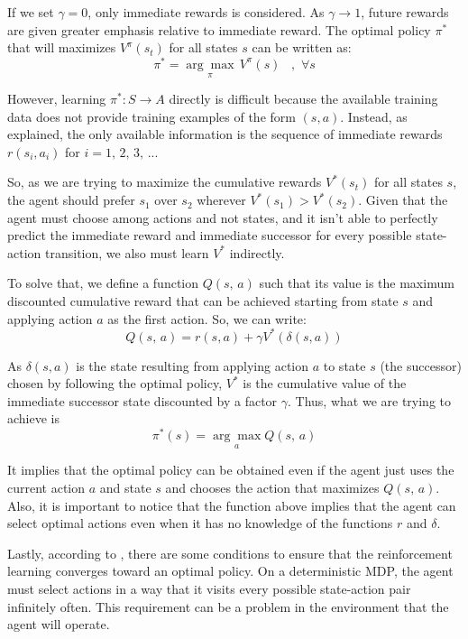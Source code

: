 \documentclass[a4paper]{article}
\begin{document}
If we set $\gamma=0$, only immediate rewards is considered. As $\gamma \rightarrow 1$, future rewards are given greater emphasis relative to immediate reward. The optimal policy $\pi^{*}$ that will maximizes $V^{\pi}(s_t)$ for all states $s$ can be written as:
$$\pi^{*} = \underset{\pi}{\arg \max} \, V^{\pi} (s)\,\,\,\,\,, \,\, \forall s$$

However, learning $\pi^{*}: S \rightarrow A$ directly is difficult because the available training data does not provide training examples of the form $(s, a)$. Instead, as \cite{Mitchell} explained, the only available information is the sequence of immediate rewards $r(s_i, a_i)$ for $i=1,\, 2,\, 3,\,...$

So, as we are trying to maximize the cumulative rewards $V^{*}(s_t)$ for all states $s$, the agent should prefer $s_1$ over $s_2$ wherever $V^{*}(s_1) > V^{*}(s_2)$. Given that the agent must choose among actions and not states, and it isn't able to perfectly predict the immediate reward and immediate successor for every possible state-action transition, we also must learn $V^{*}$ indirectly.

To solve that, we define a function $Q(s, \, a)$ such that its value is the maximum discounted cumulative reward that can be achieved starting from state $s$ and applying action $a$ as the first action. So, we can write:
$$Q(s, \, a) = r(s, a) + \gamma V^{*}(\delta(s, a))$$

As $\delta(s, a)$ is the state resulting from applying action $a$ to state $s$ (the successor) chosen by following the optimal policy, $V^{*}$ is the cumulative value of the immediate successor state discounted by a factor $\gamma$. Thus,  what we are trying to achieve is
$$\pi^{*}(s) = \underset{a}{\arg \max} Q(s, \, a)$$

It implies that the optimal policy can be obtained even if the agent just uses the current action $a$ and state $s$ and chooses the action that maximizes $Q(s,\, a)$. Also, it is important to notice that the function above implies that the agent can select optimal actions even when it has no knowledge of the functions $r$ and $\delta$.

Lastly, according to \cite{Mitchell}, there are some conditions to ensure that the reinforcement learning converges toward an optimal policy. On a deterministic MDP, the agent must select actions in a way that it visits every possible state-action pair infinitely often. This requirement can be a problem in the environment that the agent will operate.
\end{document}
